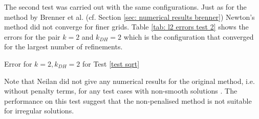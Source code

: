 
The second test was carried out with the same configurations. Just as for the method by Brenner et al. (cf. Section \ref{sec: numerical results brenner}) Newton's method did not converge for finer grids. 
Table \ref{tab: l2 errors test 2} shows the errors for the pair $k=2$ and $k_{DH}=2$ which is the configuration that converged for the largest number of refinements.

\begin{table}[H]
		\centering
		\pgfplotstabletypeset[
		columns={iterations, l2error, h1error,N},
		every row 0 column 0/.style={set content=init},
		]{\MATwodegTwoTwo}
		\caption{Error for $k=2, k_{DH}=2$ for Test \ref{test sqrt}}
	\label{tab: l2 errors test 2}
\end{table}
 
Note that Neilan did not give any numerical results for the original method, i.e. without penalty terms, for any test cases with non-smooth solutions \cite{Neilan2014}. The performance on this test suggest that the non-penalised method is not suitable for irregular solutions. 



